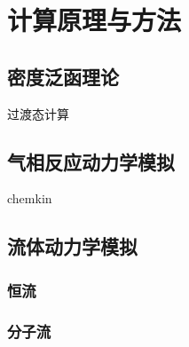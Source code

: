 \chapter{计算原理与方法}
\section{密度泛函理论}
    过渡态计算
\section{气相反应动力学模拟}
chemkin
\section{流体动力学模拟}
    \subsection{恒流}
    \subsection{分子流}
